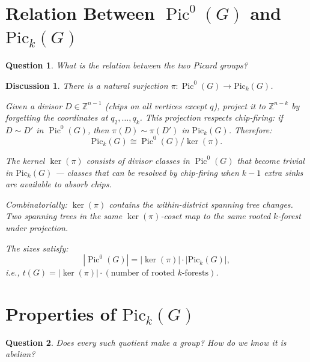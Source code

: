 \documentclass[11pt]{article}
\newcommand{\Z}{\mathbb{Z}}
\newcommand{\Pic}{\operatorname{Pic}^0}
\newtheorem{question}{Question}
\newtheorem{answer}{Discussion}
\begin{document}
\section{Relation Between $\Pic(G)$ and $\mathrm{Pic}_k(G)$}

\begin{question}
What is the relation between the two Picard groups?
\end{question}

\begin{answer}
There is a natural surjection $\pi : \Pic(G) \to \mathrm{Pic}_k(G)$.

Given a divisor $D \in \Z^{n-1}$ (chips on all vertices except $q$), project
it to $\Z^{n-k}$ by forgetting the coordinates at $q_2, \ldots, q_k$. This
projection respects chip-firing: if $D \sim D'$ in $\Pic(G)$, then
$\pi(D) \sim \pi(D')$ in $\mathrm{Pic}_k(G)$. Therefore:
\[
  \mathrm{Pic}_k(G) \cong \Pic(G) / \ker(\pi).
\]

The kernel $\ker(\pi)$ consists of divisor classes in $\Pic(G)$ that become
trivial in $\mathrm{Pic}_k(G)$ --- classes that can be resolved by chip-firing
when $k-1$ extra sinks are available to absorb chips.

Combinatorially: $\ker(\pi)$ contains the within-district spanning tree
changes. Two spanning trees in the same $\ker(\pi)$-coset map to the same
rooted $k$-forest under projection.

The sizes satisfy:
\[
  |\Pic(G)| = |\ker(\pi)| \cdot |\mathrm{Pic}_k(G)|,
\]
i.e., $t(G) = |\ker(\pi)| \cdot (\text{number of rooted $k$-forests})$.
\end{answer}


\section{Properties of $\mathrm{Pic}_k(G)$}

\begin{question}
Does every such quotient make a group? How do we know it is abelian?
\end{question}
\end{document}
